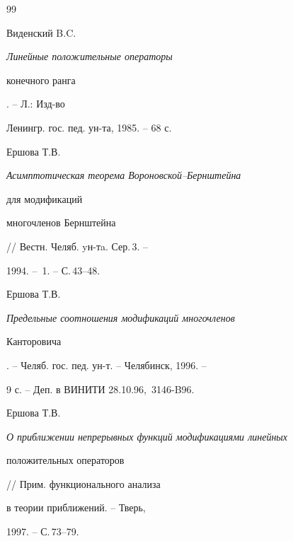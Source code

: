 \begin{thebibliography}{99}


Виденский B.C. {\em Линейные положительные операторы 


конечного ранга}. -- Л.: Изд-во 


Ле\-нингр. гос. пед. ун-та, 1985. -- 68 с. 




Ершова Т.В. {\em Асимптотическая теорема Вороновской--Бернштейна 


для модификаций 


многочленов Бернштейна} // Вестн. Челяб. yн-тa. Сер.\,3. -- 


1994. -- \No\,1. -- С.\,43--48. 




Ершова Т.В. {\em Предельные соотношения модификаций многочленов 


Канторовича}. -- Челяб. гос. пед. ун-т. -- Челябинск, 1996. -- 


9 с. -- Деп. в ВИНИТИ 28.10.96, \No\,3146-B96. 




Ершова Т.В. {\em О приближении непрерывных функций модификациями линейных 


положительных операторов} // Прим. функционального анализа 


в теории приближений. -- Тверь, 


1997. -- С.\,73--79. 


 


\end{thebibliography} 


 


\vskip 2cm 


 








 


\label{end} 


 


